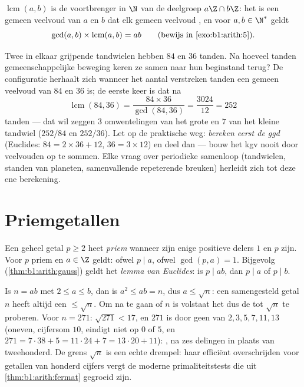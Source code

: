 \begin{definition}\label{def:b1:arith:lcm}
$\operatorname{lcm}(a, b)$ is de
voortbrenger in $\N$ van de deelgroep $a\Z \cap b\Z$: het is een gemeen
veelvoud van $a$ en $b$ dat elk gemeen veelvoud , en voor $a, b \in
\N^*$ geldt
\[
\gcd(a,b) \times \operatorname{lcm}(a,b) = ab
\qquad (\text{bewijs in } \cref{exo:b1:arith:5}).
\]
\end{definition}

\begin{example}\label{ex:b1:arith:gears}
Twee in elkaar grijpende tandwielen hebben $84$ en $36$ tanden. Na
hoeveel tanden gemeenschappelijke beweging keren ze samen naar hun
beginstand terug? De configuratie herhaalt zich wanneer het aantal
verstreken tanden een gemeen veelvoud van $84$ en $36$ is; de eerste keer
is dat na
\[
\operatorname{lcm}(84, 36) = \frac{84 \times 36}{\gcd(84, 36)}
= \frac{3024}{12} = 252
\]
tanden --- dat wil zeggen $3$ omwentelingen van het grote en $7$ van het
kleine tandwiel ($252/84$ en $252/36$). Let op de praktische weg:
\emph{bereken eerst de ggd} (Euclides: $84 = 2\times36 + 12$, $36 =
3\times12$) en deel dan --- bouw het kgv nooit door veelvouden op te
sommen. Elke vraag over periodieke samenloop (tandwielen, standen van
planeten, samenvallende repeterende breuken) herleidt zich tot deze ene
berekening.
\end{example}

\section{Priemgetallen}

\begin{definition}\label{def:b1:arith:prime}
Een geheel getal $p \geq 2$ heet \emph{priem} wanneer
zijn enige positieve delers $1$ en $p$ zijn. Voor $p$ priem en $a \in \Z$
geldt: ofwel $p \mid a$, ofwel $\gcd(p, a) = 1$. Bijgevolg
(\cref{thm:b1:arith:gauss}) geldt het \emph{lemma van Euclides}: is $p
\mid ab$, dan $p \mid a$ of $p \mid b$.
\end{definition}

\begin{remark}\label{rem:b1:arith:trialdivision}
Is $n = ab$ met $2 \leq a \leq b$, dan is $a^2 \leq ab = n$, dus $a
\leq \sqrt n$: een samengesteld getal $n$ heeft altijd een 
$\leq \sqrt n$. Om na te gaan of $n$  is volstaat het dus de
 tot $\sqrt n$ te proberen. Voor $n = 271$: $\sqrt{271} <
17$, en $271$ is door geen van $2, 3, 5, 7, 11, 13$  (oneven,
cijfersom $10$, eindigt niet op $0$ of $5$, en $271 = 7\cdot38 + 5 =
11\cdot24 + 7 = 13\cdot20 + 11$): , na zes delingen in plaats van
tweehonderd. De grens $\sqrt n$ is een echte drempel: haar efficiënt
overschrijden voor getallen van honderd cijfers vergt de moderne
primaliteitstests die uit \cref{thm:b1:arith:fermat} gegroeid zijn.
\end{remark}

